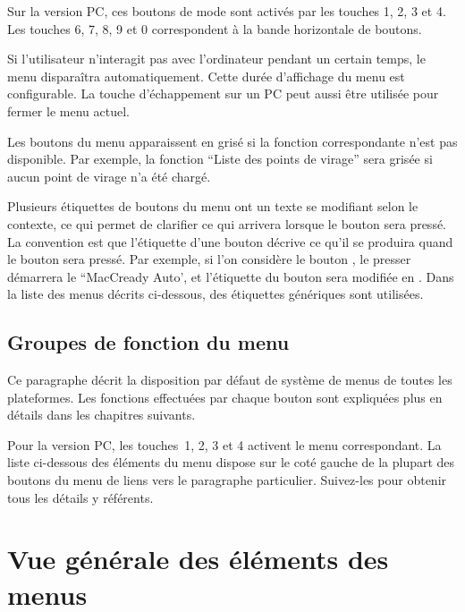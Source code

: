 Sur la version PC, ces boutons de mode sont activés par les
touches 1, 2, 3 et 4. Les touches 6, 7, 8, 9 et 0 correspondent à la bande
horizontale de boutons.

Si l'utilisateur n'interagit pas avec l'ordinateur pendant un certain temps, le
menu disparaîtra automatiquement. Cette durée d'affichage du menu est configurable.
La touche d'échappement sur un PC peut aussi être utilisée pour fermer le menu actuel.

Les boutons du menu apparaissent en grisé si la fonction correspondante n'est pas disponible.
Par exemple, la fonction ``Liste des points de virage'' sera grisée si aucun point de virage n'a été chargé.

Plusieurs étiquettes de boutons du menu ont un texte se modifiant selon le contexte, ce qui
permet de clarifier ce qui arrivera lorsque le bouton sera
pressé.
La convention est que l'étiquette d'une bouton décrive ce qu'il
se produira quand le bouton sera pressé. Par exemple, si l'on considère le bouton
, le presser démarrera le ``MacCready Auto',
et l'étiquette du bouton sera modifiée en . 
Dans la liste des menus décrits ci-dessous, des étiquettes génériques sont utilisées.

\subsection*{Groupes de fonction du menu}
Ce paragraphe décrit la disposition par défaut de système de menus de toutes
les plateformes. Les fonctions effectuées par chaque bouton sont expliquées plus
en détails dans les chapitres suivants. 

Pour la version PC, les touches~1, 2, 3 et 4 activent le
menu correspondant. La liste ci-dessous des éléments du menu dispose sur le coté gauche
de la plupart des boutons du menu de liens vers le paragraphe particulier. Suivez-les pour obtenir
tous les détails y référents.

\section{Vue générale des éléments des menus}

